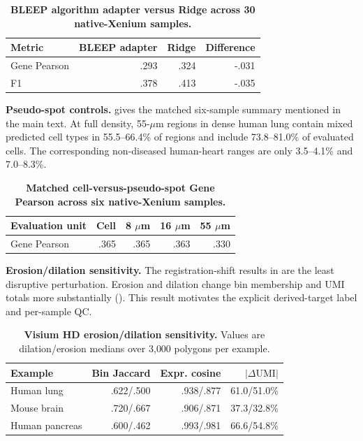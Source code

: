 \documentclass[sigconf,review]{acmart}
\begin{document}
\begin{table}[H]
\centering
\small
\caption{\textbf{BLEEP algorithm adapter versus Ridge across 30
native-Xenium samples.}}
\label{tab:appendix_bleep_negative}
\begin{tabular}{lrrr}
\toprule
Metric & BLEEP adapter & Ridge & Difference \\
\midrule
Gene Pearson & .293 & .324 & -.031 \\
F1 & .378 & .413 & -.035 \\
\bottomrule
\end{tabular}
\end{table}

\noindent\textbf{Pseudo-spot controls.}
 gives the matched six-sample summary mentioned in
the main text. At full density, 55-\(\mu\)m regions in dense human lung contain
mixed predicted cell types in 55.5--66.4\% of regions and include
73.8--81.0\% of evaluated cells. The corresponding non-diseased human-heart
ranges are only 3.5--4.1\% and 7.0--8.3\%.

\begin{table}[H]
\centering
\small
\caption{\textbf{Matched cell-versus-pseudo-spot Gene Pearson across six
native-Xenium samples.}}
\label{tab:appendix_pseudospot}
\begin{tabular}{lrrrr}
\toprule
Evaluation unit & Cell & 8 \(\mu\)m & 16 \(\mu\)m & 55 \(\mu\)m \\
\midrule
Gene Pearson & .365 & .365 & .363 & .330 \\
\bottomrule
\end{tabular}
\end{table}

\noindent\textbf{Erosion/dilation sensitivity.}
The registration-shift results in  are the least
disruptive perturbation. Erosion and dilation change bin membership and UMI
totals more substantially (). This result
motivates the explicit derived-target label and per-sample QC.

\begin{table}[H]
\centering
\small
\setlength{\tabcolsep}{3pt}
\caption{\textbf{Visium HD erosion/dilation sensitivity.} Values are
dilation/erosion medians over 3{,}000 polygons per example.}
\label{tab:appendix_hd_boundary}
\begin{tabular}{lrrr}
\toprule
Example & Bin Jaccard & Expr. cosine & \(|\Delta\mathrm{UMI}|\) \\
\midrule
Human lung & .622/.500 & .938/.877 & 61.0/51.0\% \\
Mouse brain & .720/.667 & .906/.871 & 37.3/32.8\% \\
Human pancreas & .600/.462 & .993/.981 & 66.6/54.8\% \\
\bottomrule
\end{tabular}
\end{table}
\end{document}
